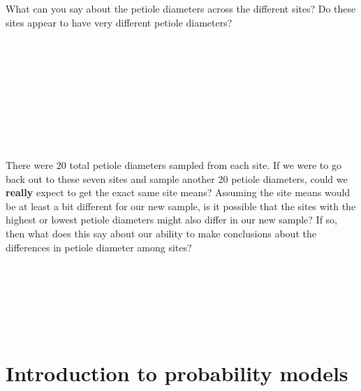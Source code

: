 \documentclass[
  openany]{krantz}
\begin{document}
What can you say about the  petiole diameters across the different sites?
Do these sites appear to have very different  petiole diameters?

\begin{verbatim}









\end{verbatim}

There were 20 total petiole diameters sampled from each site.
If we were to go back out to these seven sites and sample another 20 petiole diameters, could we \textbf{really} expect to get the exact same site means?
Assuming the site means would be at least a bit different for our new sample, is it possible that the sites with the highest or lowest petiole diameters might also differ in our new sample?
If so, then what does this say about our ability to make conclusions about the differences in petiole diameter among sites?

\begin{verbatim}






\end{verbatim}

\hypertarget{Chapter_15}{%
\chapter{Introduction to probability models}\label{Chapter_15}}
\end{document}
